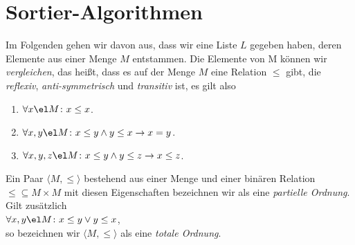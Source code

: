 \chapter{Sortier-Algorithmen}
Im Folgenden gehen wir davon aus, dass wir eine Liste $L$ gegeben haben, deren Elemente
aus einer Menge $M$ entstammen.  
Die Elemente von M k\"onnen wir \emph{vergleichen}, das
hei\ss{}t, dass es auf der Menge $M$  eine Relation
$\leq$ gibt, die \emph{reflexiv}, \emph{anti-symmetrisch} und \emph{transitiv} ist, es gilt also  
\begin{enumerate}
\item $\forall x \el M \colon x \leq x$.
\item $\forall x, y \el M \colon x \leq y \wedge y \leq x \rightarrow x = y$.
\item $\forall x, y, z \el M \colon x \leq y \wedge y \leq z \rightarrow x \leq z$. 
\end{enumerate}
Ein Paar $\langle M, \leq \rangle$ bestehend aus einer Menge und einer bin\"aren Relation
$\leq \subseteq M \times M$ mit diesen Eigenschaften bezeichnen wir als eine
\emph{partielle Ordnung}.  Gilt zus\"atzlich \\[0.1cm]
\hspace*{1.3cm} $\forall x, y \el M \colon x \leq y \vee y \leq x$, \\[0.1cm]
so bezeichnen wir $\langle M, \leq \rangle$ als eine \emph{totale Ordnung}.
\vspace*{0.3cm}

